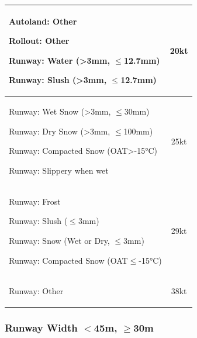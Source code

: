 \documentclass[twoside]{article}
\renewcommand{\ref}[1]{{\color{blue}\scriptsize [#1]}}
\newcommand{\secref}[1]{\vspace{-3mm}\ref{#1}}
\begin{document}
{\begin{center}
\begin{tabular}{|l|c|}
  \parbox{0.55\textwidth}{
    \vspace{1mm}
    \begin{compactitem}
     \item Autoland: Other
     \item Rollout: Other
     \item Runway: Water (>3mm, $\leq$12.7mm)
     \item Runway: Slush (>3mm, $\leq$12.7mm)
    \end{compactitem}
    \vspace{1mm}} & 20kt\\\hline

  \parbox{0.55\textwidth}{
    \vspace{1mm}
    \begin{compactitem}
     \item Runway: Wet Snow (>3mm, $\leq$30mm)
     \item Runway: Dry Snow (>3mm, $\leq$100mm)
     \item Runway: Compacted Snow (OAT>-15°C)
     \item Runway: Slippery when wet
    \end{compactitem}
    \vspace{1mm}} & 25kt\\\hline

  \parbox{0.55\textwidth}{
    \vspace{1mm}
    \begin{compactitem}
     \item Runway: Frost
     \item Runway: Slush ($\leq$3mm)
     \item Runway: Snow (Wet or Dry, $\leq$3mm)
     \item Runway: Compacted Snow (OAT$\leq$-15°C)
    \end{compactitem}
    \vspace{1mm}} & 29kt\\\hline

  \parbox{0.5\textwidth}{
    \vspace{1mm}
    \begin{compactitem}
    \item Runway: Other
    \end{compactitem}
    \vspace{1mm}} & 38kt\\\hline

\end{tabular}
\end{center}
\subsubsection{Runway Width $<$45m, $\ge$30m}
\secref{PRO.SPO.60}
\begin{center}
\begin{tabular}{|l|c|}\hline


\end{tabular}
\end{center}}
\end{document}
